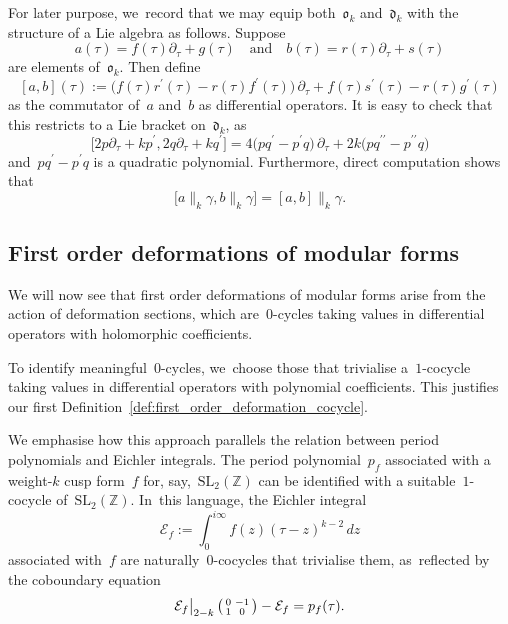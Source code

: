 \documentclass[JEP,XML,SOM,Unicode,published]{cedram}
\theoremstyle{plain}
\theoremstyle{definition}
\newcommand{\tx}{\text}
\newcommand{\nbd}{\nobreakdash-\hspace{0pt}}
\newcommand{\bbZ}{\ensuremath{\mathbb{Z}}}
\newcommand{\cE}{\ensuremath{\mathcal{E}}}
\newcommand{\frakd}{\ensuremath{\mathfrak{d}}}
\newcommand{\frako}{\ensuremath{\mathfrak{o}}}
\newcommand{\defeq}{:=}
\newenvironment{psmatrix}{\bigl(\begin{smallmatrix}}{\end{smallmatrix}\bigr)}
\newcommand{\SL}[1]{\ensuremath{\mathrm{SL}_{#1}}}
\let\ga\gamma
\begin{document}
For later purpose, we~record that we may equip both~$\frako_k$ and~$\frakd_k$ with the structure of a Lie algebra as follows. Suppose
\begin{equation*}
a(\tau) = f(\tau)\partial_\tau + g(\tau)
\quad\tx{and}\quad
b(\tau) = r(\tau)\partial_\tau + s(\tau)
\end{equation*}
are elements of~$\frako_k$. Then define
\begin{equation}
\label{eq:def:lie_bracket_ok}
[a,b](\tau)
\defeq
\bigl(f(\tau)r^\prime(\tau) - r(\tau)f^\prime(\tau) \bigr)\,\partial_\tau
+ f(\tau)s^\prime(\tau) - r(\tau)g^\prime(\tau)
\end{equation}
as the commutator of~$a$ and~$b$ as differential operators. It is easy to check that this restricts to a Lie bracket on~$\frakd_k$, as
\begin{equation*}
\big[ 2p\partial_\tau + kp^\prime,2q\partial_\tau + kq^\prime \big]
=
4\bigl(pq^\prime - p^\prime q \bigr)\,\partial_\tau
+ 2k\bigl(pq^{\prime\prime} - p^{\prime\prime}q \bigr)
\end{equation*}
and~$pq^\prime - p^\prime q$ is a quadratic polynomial. Furthermore, direct computation shows that
\begin{equation}
\big[a\big\|_k \ga, b\big\|_k \ga \big] = [a,b]\big\|_k\ga
\tx{.}
\end{equation}

\subsection{First order deformations of modular forms}
\label{ssec:first_order_deformations_modular_forms}

We will now see that first order deformations of modular forms arise from the action of deformation sections, which are~$0$\nbd{}cycles taking values in differential operators with holomorphic coefficients.

To identify meaningful~$0$\nbd{}cycles, we~choose those that trivialise a~$1$\nbd{}cocycle taking values in differential operators with polynomial coefficients. This justifies our first Definition~\ref{def:first_order_deformation_cocycle}.

We emphasise how this approach parallels the relation between period polynomials and Eichler integrals. The period polynomial~$p_f$ associated with a weight\nbd{}$k$ cusp form~$f$ for, say,~$\SL{2}(\bbZ)$ can be identified with a suitable~$1$\nbd{}cocycle of~$\SL{2}(\bbZ)$. In~this language, the Eichler integral~
\[
\cE_f:= \int_0^{i\infty} f(z)(\tau-z)^{k-2}\, dz\]
associated with~$f$ are naturally~$0$\nbd{}cocycles that trivialise them, as~reflected by the coboundary equation
\begin{equation*}
\cE_f \big|_{2-k}\,\begin{psmatrix} 0 & -1 \\ 1 & 0 \end{psmatrix}
-
\cE_f
=
p_f(\tau)
\tx{.}
\end{equation*}
\end{document}
